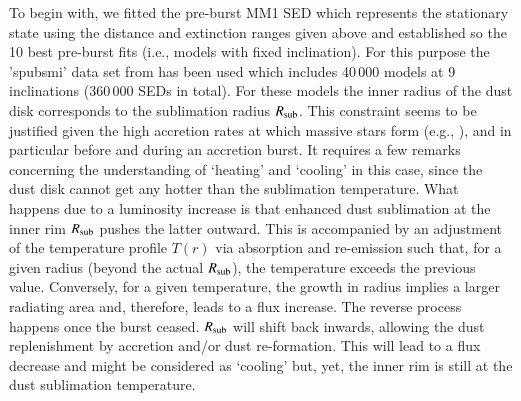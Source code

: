 To begin with, we fitted the pre-burst MM1 SED which represents the stationary state using the distance and extinction ranges given above and established so the 10 best pre-burst 
fits (i.e., models with fixed inclination).
For this purpose 
the 'spubsmi' data set from \citet{2017A&A...600A..11R} has been used which includes 
40\,000 models 
at 9 inclinations (360\,000 SEDs in total).
For these models the inner radius of the dust disk corresponds to the sublimation radius $R_{\rm sub}$. This constraint seems to be justified given the high accretion rates at which massive stars form (e.g., \citealp{2007ARA&A..45..481Z, 2016ApJ...832...40K}), and in particular before and during an accretion burst. It requires a few remarks concerning the understanding of `heating' and `cooling' in this case, since the dust disk cannot get any hotter than the sublimation temperature. What happens due to a luminosity increase is that enhanced dust sublimation at the inner rim $R_{\rm sub}$ pushes the latter outward. This is accompanied by an adjustment of the temperature profile $T(r)$ via absorption and re-emission such that, for a given radius (beyond the actual $R_{\rm sub}$), the temperature exceeds the previous value. Conversely, for a given temperature, the growth in radius implies a larger radiating area and, therefore, leads to a flux increase. 
The reverse process happens once the burst ceased. $R_{\rm sub}$ will shift back inwards, allowing the dust replenishment by accretion and/or dust re-formation. This will lead to a flux decrease and might be considered as `cooling' but, yet, the inner rim is still at the dust sublimation temperature.

